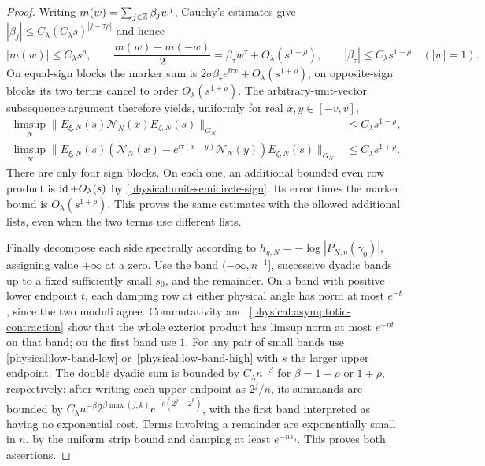 \begin{proof}
Writing $m(w)=\sum_{j\in\mathbb Z}\beta_jw^j$, Cauchy's estimates give
$|\beta_j|\le C_\lambda(C_\lambda s)^{|j-\tau\rho|}$ and hence
\begin{equation}\label{physical:Laurent-modes}
 |m(w)|\le C_\lambda s^\rho,\qquad
 \frac{m(w)-m(-w)}2=\beta_\tau w^\tau
       +O_\lambda(s^{1+\rho}),\qquad
 |\beta_\tau|\le C_\lambda s^{1-\rho}
 \quad (|w|=1).
\end{equation}
On equal-sign blocks the marker sum is
$2\sigma\beta_\tau e^{\ii\tau x}+O_\lambda(s^{1+\rho})$;
on opposite-sign blocks its two terms cancel to order
$O_\lambda(s^{1+\rho})$. The arbitrary-unit-vector subsequence
argument therefore yields, uniformly for real $x,y\in[-v,v]$,
\begin{align}
 \limsup_N\|E_{\xi,N}(s)\mathcal N_N(x)E_{\zeta,N}(s)\|_{G_N}
       &\le C_\lambda s^{1-\rho},\label{physical:low-band-low}\\
 \limsup_N\|E_{\xi,N}(s)
   (\mathcal N_N(x)-e^{\ii\tau(x-y)}\mathcal N_N(y))
   E_{\zeta,N}(s)\|_{G_N}
       &\le C_\lambda s^{1+\rho}.
       \label{physical:low-band-high}
\end{align}
There are only four sign blocks. On each one, an additional bounded
even row product is $\operatorname{id}+O_\lambda(s)$ by
\eqref{physical:unit-semicircle-sign}. Its error times the marker
bound is $O_\lambda(s^{1+\rho})$. This proves the same estimates
with the allowed additional lists, even when the two terms use
different lists.

Finally decompose each side spectrally according to
$h_{\eta,N}=-\log|P_{N,\eta}(\gamma_0)|$, assigning value $+\infty$
at a zero. Use the band $(-\infty,n^{-1}]$, successive dyadic bands
up to a fixed sufficiently small $s_0$, and the remainder.
On a band with positive lower endpoint $t$, each damping row at either
physical angle has norm at most $e^{-t}$, since the two moduli agree.
Commutativity and~\eqref{physical:asymptotic-contraction} show that the
whole exterior product has limsup norm at most $e^{-nt}$ on that band;
on the first band use $1$. For any pair of small bands use
\eqref{physical:low-band-low} or~\eqref{physical:low-band-high} with $s$
the larger upper endpoint. The double dyadic sum is bounded by
$C_\lambda n^{-\beta}$ for $\beta=1-\rho$ or $1+\rho$, respectively:
after writing each upper endpoint as $2^j/n$, its summands are bounded
by $C_\lambda n^{-\beta}2^{\beta\max(j,k)}e^{-c(2^j+2^k)}$, with the
first band interpreted as having no exponential cost. Terms involving
a remainder are exponentially small in $n$, by the uniform strip bound
and damping at least $e^{-ns_0}$. This proves both assertions.
\end{proof}

